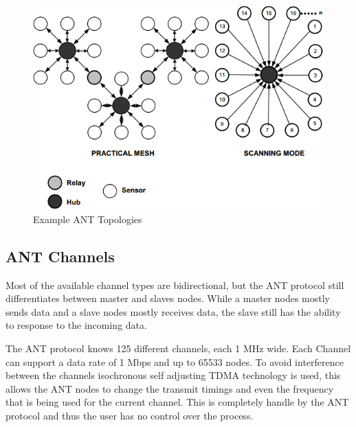 \begin{figure}[h]
	\centering
	\includegraphics[scale=0.7]{./pics/ANTtopo.png}
	\caption{Example ANT Topologies}\label{fig:anttopo}
\end{figure}

\subsection{ANT Channels}
Most of the available channel types are bidirectional, but the ANT protocol still differentiates between master and slaves nodes. While a master nodes mostly sends data and a slave nodes mostly receives data, the slave still has the ability to response to the incoming data.

The ANT protocol knows 125 different channels, each 1 MHz wide. Each Channel can support a data rate of 1 Mbps and up to 65533 nodes. To avoid interference between the channels isochronous self adjusting TDMA technology is used, this allows the ANT nodes to change the transmit timings and even the frequency that is being used for the current channel. This is completely handle by the ANT protocol and thus the user has no control over the process.

